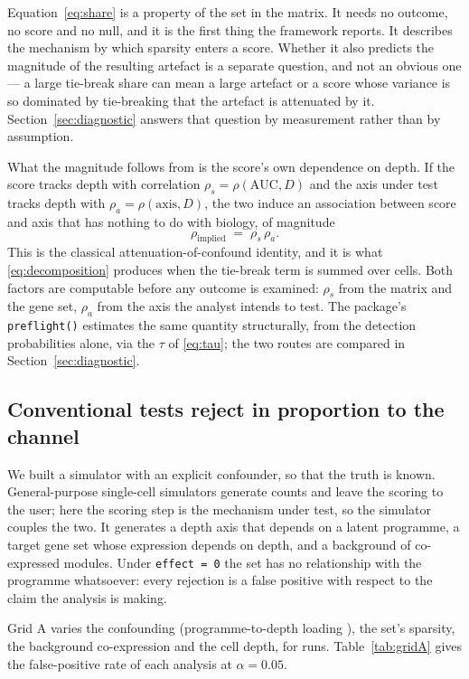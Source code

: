 \documentclass[11pt]{article}
\newcommand{\code}[1]{\texttt{#1}}
\begin{document}
Equation~\eqref{eq:share} is a property of the set in the matrix. It needs no
outcome, no score and no null, and it is the first thing the framework reports.
It describes the mechanism by which sparsity enters a score. Whether it also
predicts the magnitude of the resulting artefact is a separate question, and not
an obvious one --- a large tie-break share can mean a large artefact or a score
whose variance is so dominated by tie-breaking that the artefact is attenuated
by it. Section~\ref{sec:diagnostic} answers that question by measurement rather
than by assumption.

What the magnitude follows from is the score's own dependence on depth. If the
score tracks depth with correlation $\rho_s = \rho(\mathrm{AUC}, D)$ and the
axis under test tracks depth with $\rho_a = \rho(\text{axis}, D)$, the two
induce an association between score and axis that has nothing to do with
biology, of magnitude
\begin{equation}
\rho_{\text{implied}} \;=\; \rho_s \,\rho_a .
\label{eq:implied}
\end{equation}
This is the classical attenuation-of-confound identity, and it is what
\eqref{eq:decomposition} produces when the tie-break term is summed over cells.
Both factors are computable before any outcome is examined: $\rho_s$ from the
matrix and the gene set, $\rho_a$ from the axis the analyst intends to test.
The package's \code{preflight()} estimates the same quantity structurally, from
the detection probabilities alone, via the $\tau$ of \eqref{eq:tau}; the two
routes are compared in Section~\ref{sec:diagnostic}.

\subsection{Conventional tests reject in proportion to the channel}

We built a simulator with an explicit confounder, so that the truth is known.
General-purpose single-cell simulators \citep{zappia2017,vieth2017} generate
counts and leave the scoring to the user; here the scoring step is the
mechanism under test, so the simulator couples the two.
It generates a depth axis that depends on a latent programme, a target gene set
whose expression depends on depth, and a background of co-expressed modules.
Under \code{effect = 0} the set has no relationship with the programme
whatsoever: every rejection is a false positive with respect to the claim the
analysis is making.

Grid A varies the confounding (programme-to-depth loading \confLevels),
the set's sparsity, the background co-expression and the cell depth, for
\gridARuns{} runs. Table~\ref{tab:gridA} gives the false-positive rate of each
analysis at $\alpha=0.05$.
\end{document}
